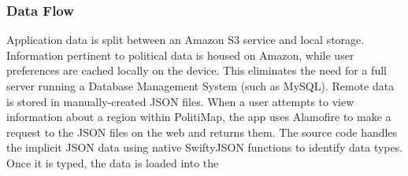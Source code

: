 \documentclass[12pt,oneside,letterpaper]{article}
\newcounter{use_case}
\begin{document}
\subsubsection{Data Flow}
Application data is split between an Amazon S3 service and local storage.
Information pertinent to political data is housed on Amazon, while user
preferences are cached locally on the device. This eliminates the need for
a full server running a Database Management System (such as MySQL). Remote
data is stored in manually-created JSON files. When a user attempts to view
information about a region within PolitiMap, the app uses Alamofire
to make a request to the JSON files on the web and returns them. The source
code handles the implicit JSON data using native SwiftyJSON functions to
identify data types. Once it is typed, the data is loaded into the 
\end{document}
